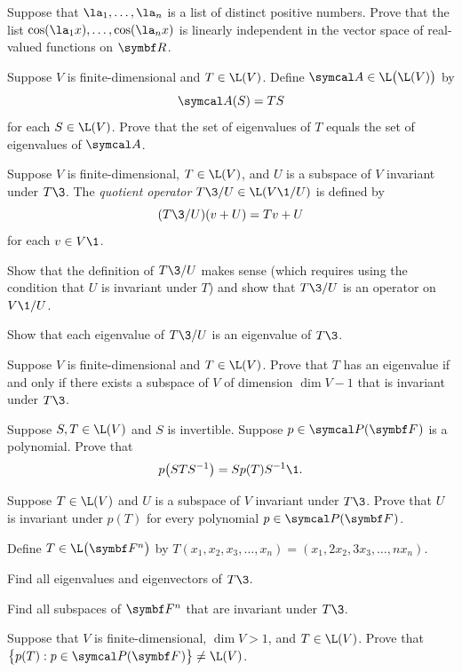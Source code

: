 \begin{exercises}
\exercise
Suppose that $\la_1, \dots, \la_n$ is a list of distinct positive numbers. Prove that the list $\cos(\la_1 x), \dots, \cos(\la_n x)$ is linearly independent in the vector space of real-valued functions on $\R{}$.


\exercise
Suppose $V$ is finite-dimensional and $T \in \L(V)$. Define $\A \in \L\paren[\big]{\L(V)}$ by \label{LLV}
\[
\A(S) = TS
\]
for each $S \in \L(V)$. Prove that the set of eigenvalues of $T$ equals the set of eigenvalues of $\A$.


\exercise
Suppose $V$ is finite-dimensional, $T \in \L(V)$, and $U$ is a subspace of $V$ invariant under $T\3$. The \emph{quotient operator}
$T\3/U \in \L(V\1/U)$ is defined by\label{5quotient}
\[
(T\3/U)(v + U) = Tv +U
\]
for each $v \in V\1$.
\begin{subtheorem}
\item
Show that the definition of $T\3/U$ makes sense (which requires using the condition that $U$ is invariant under $T$) and show that $T\3/U$ is an operator on $V\1/U$.
\item
Show that each eigenvalue of $T\3/U$ is an eigenvalue of $T\3$.
\end{subtheorem}
\exercisesubtheoremend


\exercise
Suppose $V$ is finite-dimensional and $T \in \L(V)$. Prove that $T$ has an eigenvalue if and only if there exists a subspace of $V$ of dimension $\dim V - 1$ that is invariant under $T\3$.

\exercise
Suppose $S, T \in \L(V)$ and $S$ is invertible.  Suppose $p \in \P(\F{})$ is a polynomial. Prove that
\[
p\paren[\big]{STS^{-1}} = S p(T) S^{-1}\1.
\]
\exercisedisplayend


\exercise
Suppose $T \in \L(V)$ and $U$ is a subspace of $V$ invariant under $T\3$. Prove that $U$ is invariant under $p(T)$ for every polynomial $p \in \P(\F{})$.\label{InvPoly}


\exercise
Define $T \in \L\paren[\big]{\F{n}}$ by
$
T(x_1, x_2, x_3, \dots, x_n) = (x_1, 2x_2, 3x_3, \dots, n x_n)$.
\begin{subtheorem}
\item
Find all eigenvalues and eigenvectors of $T\3$.
\item
Find all subspaces of $\F n$ that are invariant under $T\3$.
\end{subtheorem}
\exercisesubtheoremend


\exercise
Suppose that $V$ is finite-dimensional, $\dim V > 1$, and $T \in \L(V)$. Prove that
$
\br[\big]{p(T): p \in \P(\F{})} \ne \L(V)$.


\end{exercises}

